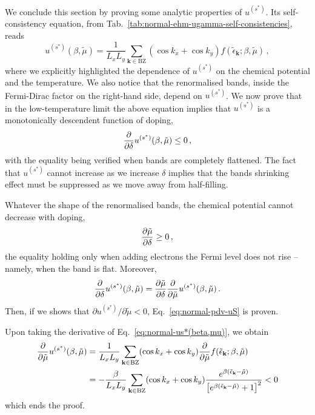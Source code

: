 We conclude this section by proving some analytic properties of $u^{(s^*)}$. Its self-consistency equation, from Tab.~\ref{tab:normal-ehm-ugamma-self-consistencies}, reads
\begin{equation}\label{eq:normal-us*(beta,mu)}
	u^{(s^*)}(\beta,\tilde{\mu}) = \frac{1}{L_x L_y} \sum_{\mathbf{k}\in\mathrm{BZ}} (\cos k_x + \cos k_y) f(\tilde{\epsilon}_\mathbf{k};\beta,\tilde{\mu}) \, ,
\end{equation}
where we explicitly highlighted the dependence of $u^{(s^*)}$ on the chemical potential and the temperature. We also notice that the renormalised bands, inside the Fermi-Dirac factor on the right-hand side, depend on $u^{(s^*)}$. We now prove that in the low-temperature limit the above equation implies that $u^{(s^*)}$ is a monotonically descendent function of doping,
\begin{equation}\label{eq:normal-pdv-uS}
	\pdv{}{\delta} u^{(s^*)}(\beta,\tilde{\mu}) \le 0 \, ,
\end{equation}
with the equality being verified when bands are completely flattened. The fact that $u^{(s^*)}$ cannot increase as we increase $\delta$ implies that the bands shrinking effect must be suppressed as we move away from half-filling.

\begin{tabproof}
	
	Whatever the shape of the renormalised bands, the chemical potential cannot decrease with doping,
	\[
		\pdv{\tilde{\mu}}{\delta} \ge 0 \, ,
	\]
	the equality holding only when adding electrons the Fermi level does not rise -- namely, when the band is flat. Moreover,
	\[
		\pdv{}{\delta} u^{(s^*)}(\beta,\tilde{\mu}) = \pdv{\tilde{\mu}}{\delta}  \pdv{}{\tilde{\mu}} u^{(s^*)}(\beta,\tilde{\mu}) \, .
	\]
	Then, if we shows that $\partial u^{(s^*)} / \partial \tilde{\mu} < 0$, Eq.~\eqref{eq:normal-pdv-uS} is proven.
	
	Upon taking the derivative of Eq.~\eqref{eq:normal-us*(beta,mu)}, we obtain
	\[
	\begin{aligned}
		\pdv{}{\tilde{\mu}} u^{(s^*)}(\beta,\tilde{\mu}) &= \frac{1}{L_x L_y} \sum_{\mathbf{k}\in\mathrm{BZ}} (\cos k_x + \cos k_y) \pdv{}{\tilde{\mu}} f(\tilde{\epsilon}_\mathbf{k};\beta,\tilde{\mu}) \\
		&= -\frac{\beta}{L_x L_y} \sum_{\mathbf{k}\in\mathrm{BZ}} (\cos k_x + \cos k_y) \frac{e^{\beta(\tilde{\epsilon}_\mathbf{k}-\tilde{\mu})}}{\left[e^{\beta(\tilde{\epsilon}_\mathbf{k}-\tilde{\mu})}+1\right]^2} < 0
	\end{aligned}
	\]
	which ends the proof.
\end{tabproof}

